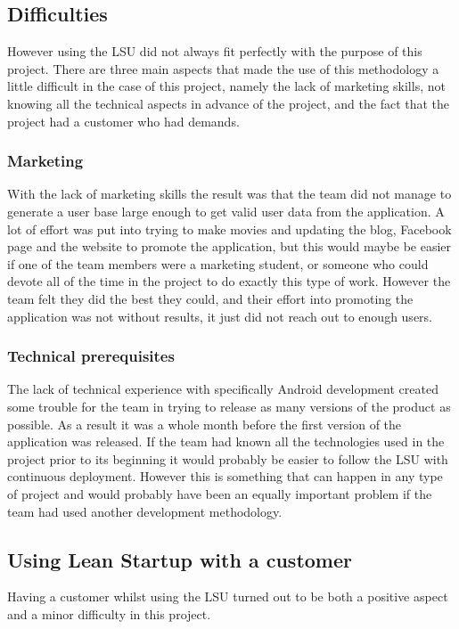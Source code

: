 \subsection{Difficulties}
However using the \gls{LSU} did not always fit perfectly with the purpose of this project. There are three main aspects that made the use of this methodology a little difficult in the case of this project, namely the lack of marketing skills, not knowing all the technical aspects in advance of the project, and the fact that the project had a customer who had demands. 

\subsubsection{Marketing}
With the lack of marketing skills the result was that the team did not manage to generate a user base large enough to get valid user data from the application. A lot of effort was put into trying to make movies and updating the blog, Facebook page and the website to promote the application, but this would maybe be easier if one of the team members were a marketing student, or someone who could devote all of the time in the project to do exactly this type of work. However the team felt they did the best they could, and their effort into promoting the application was not without results, it just did not reach out to enough users.

\subsubsection{Technical prerequisites}
The lack of technical experience with specifically Android development created some trouble for the team in trying to release as many versions of the product as possible. As a result it was a whole month before the first version of the application was released. If the team had known all the technologies used in the project prior to its beginning it would probably be easier to follow the \gls{LSU} with continuous deployment. However this is something that can happen in any type of project and would probably have been an equally important problem if the team had used another development methodology. 
 
\subsection{Using Lean Startup with a customer}
Having a customer whilst using the \gls{LSU} turned out to be both a positive aspect and a minor difficulty in this project. 


